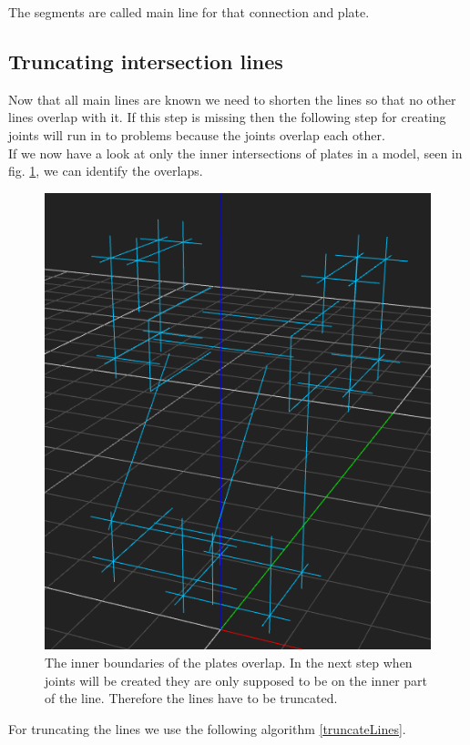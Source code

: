 \documentclass[../ClassicThesis.tex]{subfiles}
\begin{document}
The segments are called main line for that connection and plate.

\subsection{Truncating intersection lines}
Now that all main lines are known we need to shorten the lines so that no other lines overlap with it. If this step is missing then the following step for creating joints will run in to problems because the joints overlap each other.\\
If we now have a look at only the inner intersections of plates in a model, seen in fig. \ref{fig:innerBoundaries}, we can identify the overlaps.
\begin{figure}[!ht]
\centering
\includegraphics[width=.5\columnwidth]{Images/HeadInnerBoundaries.png}
\caption{The inner boundaries of the plates overlap. In the next step when joints will be created they are only supposed to be on the inner part of the line. Therefore the lines have to be truncated.}
\label{fig:innerBoundaries}
\end{figure}
For truncating the lines we use the following algorithm \ref{truncateLines}.
\\
\end{document}

